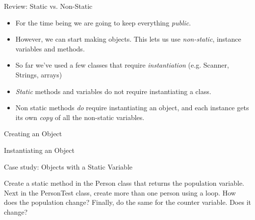 \begin{frame}{Review: Static vs. Non-Static}
\begin{itemize}
\item For the time being we are going to keep everything \emph{public}.
\item However, we can start making objects. This lets us use \emph{non-static}, instance variables and methods. \pause
\item So far we've used a few classes that require \emph{instantiation} (e.g. Scanner, Strings, arrays) \pause
\item \emph{Static} methods and variables do not require instantiating a class.
\item Non static methods \emph{do} require instantiating an object, and each instance gets its own \emph{copy} of all the non-static variables.
\end{itemize}
\end{frame}

\begin{frame}[fragile]{Creating an Object}
\begin{semiverbatim}\end{semiverbatim}
\end{frame}

\begin{frame}[fragile]{Instantiating an Object}
\begin{semiverbatim}\end{semiverbatim}
\end{frame}

\begin{frame}{Case study: Objects with a Static Variable}
\begin{center}
Create a static method in the Person class that returns the population variable. Next in the PersonTest class, create more than one person using a loop. How does the population change? Finally, do the same for the counter variable. Does it change?
\end{center}
\end{frame}

